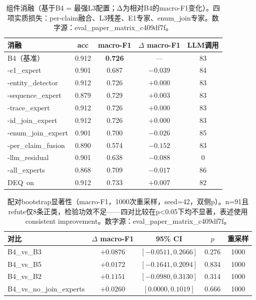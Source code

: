 \begin{table}[t]
\centering
\small
\caption{组件消融（基于B4 = 最强L3配置；Δ为相对B4的macro-F1变化）。四项实质损失：per-claim融合、L3残差、E1专家、enum\_join专家。数字源：eval\_paper\_matrix\_c409df7f。}
\label{tab:ablation}
\begin{tabular}{lcccc}
\toprule
消融 & acc & macro-F1 & $\Delta$ macro-F1 & LLM调用 \\
\midrule
B4（基准） & 0.912 & \textbf{0.726} & — & 83 \\
\midrule
-e1\_expert & 0.901 & 0.687 & \textbf{$ -0.039 $} & 84 \\
-entity\_detector & 0.912 & 0.726 & $ +0.000 $ & 83 \\
-sequence\_expert & 0.879 & 0.729 & $ +0.003 $ & 83 \\
-trace\_expert & 0.912 & 0.726 & $ +0.000 $ & 83 \\
-id\_join\_expert & 0.912 & 0.726 & $ +0.000 $ & 83 \\
-enum\_join\_expert & 0.901 & 0.700 & \textbf{$ -0.026 $} & 85 \\
-per\_claim\_fusion & 0.890 & 0.574 & \textbf{$ -0.152 $} & 83 \\
-llm\_residual & 0.901 & 0.638 & \textbf{$ -0.088 $} & 0 \\
-all\_experts & 0.868 & 0.709 & \textbf{$ -0.017 $} & 86 \\
DEQ\ on & 0.912 & 0.733 & $ +0.007 $ & 82 \\
\bottomrule
\end{tabular}
\end{table}

\begin{table}[t]
\centering
\small
\caption{配对bootstrap显著性（macro-F1，1000次重采样，seed=42，双侧p）。n=91且refute仅8条正类，检验功效不足——四对比较在p<0.05下均不显著，表述使用consistent improvement。数字源：eval\_paper\_matrix\_c409df7f。}
\label{tab:bootstrap}
\begin{tabular}{lcccc}
\toprule
对比 & $\Delta$ macro-F1 & 95\% CI & $p$ & 重采样 \\
\midrule
B4\_vs\_B3 & $ +0.0876 $ & $[-0.0511, 0.2666]$ & 0.276 & 1000 \\
B4\_vs\_B5 & $ +0.0172 $ & $[-0.1641, 0.2094]$ & 0.834 & 1000 \\
B4\_vs\_B2 & $ +0.1151 $ & $[-0.0980, 0.3130]$ & 0.314 & 1000 \\
B4\_vs\_no\_join\_experts & $ +0.0260 $ & $[0.0000, 0.1019]$ & 0.666 & 1000 \\
\bottomrule
\end{tabular}
\end{table}

